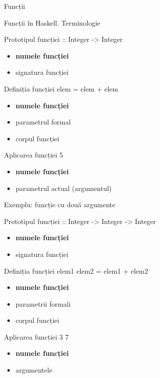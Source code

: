 \documentclass[xcolor=pdftex,romanian,colorlinks]{beamer}
\begin{document}
\begin{section}{Funcții}



\begin{frame}{Funcții în Haskell. Terminologie}
\begin{block}{Prototipul funcției \hfill
{\color{black}{\bf double} {:: Integer -> Integer}}}
\begin{itemize}
\item {\bf numele funcției}
\item signatura funcției
\end{itemize}
\end{block}
\begin{block}{Definiția funcției \hfill {\color{black}{\bf double}} \alert{elem} {\color{black}= elem + elem}}

\begin{itemize}
\item {\bf numele funcției}
\item \alert{parametrul formal}
\item corpul funcției
\end{itemize}
\end{block}
\begin{block}{Aplicarea funcției \hfill {\color{black}{\bf double}} \alert{5}}
\begin{itemize}
\item {\bf numele funcției}
\item \alert{parametrul actual (argumentul)}
\end{itemize}
\end{block}
\end{frame}

\begin{frame}{Exemplu: funcție cu două argumente}
\begin{block}{Prototipul funcției \hfill
{\color{black}{\bf add} {:: Integer -> Integer  -> Integer}}}
\begin{itemize}
\item {\bf numele funcției}
\item signatura funcției
\end{itemize}
\end{block}
\begin{block}{Definiția funcției \hfill {\color{black}{\bf add}} \alert{elem1} \alert{elem2} {\color{black}= elem1 + elem2}}

\begin{itemize}
\item {\bf numele funcției}
\item \alert{parametrii formali}
\item corpul funcției
\end{itemize}
\end{block}
\begin{block}{Aplicarea funcției \hfill {\color{black}{\bf add}} \alert{3} \alert{7}}
\begin{itemize}
\item {\bf numele funcției}
\item \alert{argumentele}
\end{itemize}
\end{block}
\end{frame}


\end{section}
\end{document}
